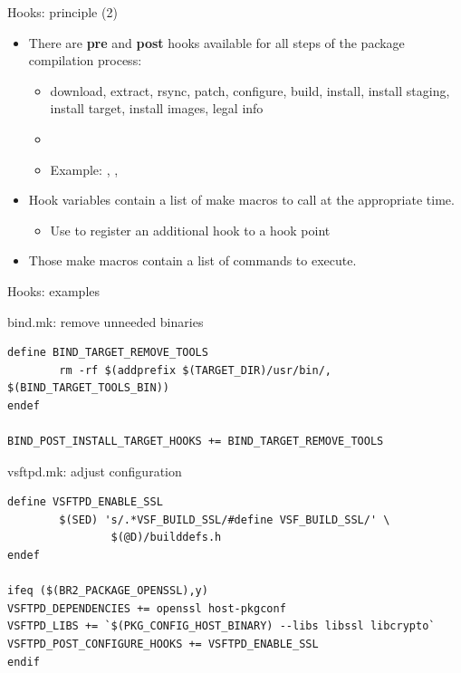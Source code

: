 \begin{frame}{Hooks: principle (2)}
  \begin{itemize}
  \item There are {\bf pre} and {\bf post} hooks available for all
    steps of the package compilation process:
    \begin{itemize}
    \item download, extract, rsync, patch, configure, build, install,
      install staging, install target, install images, legal info
    \item {}
    \item Example: ,
      , 
    \end{itemize}
  \item Hook variables contain a list of make macros to call at the
    appropriate time.
    \begin{itemize}
    \item Use \code{+=} to register an additional hook to a hook point
    \end{itemize}
  \item Those make macros contain a list of commands to execute.
  \end{itemize}
\end{frame}

\begin{frame}[fragile]{Hooks: examples}

\begin{block}{bind.mk: remove unneeded binaries}
  \begin{verbatim}
define BIND_TARGET_REMOVE_TOOLS
        rm -rf $(addprefix $(TARGET_DIR)/usr/bin/, $(BIND_TARGET_TOOLS_BIN))
endef

BIND_POST_INSTALL_TARGET_HOOKS += BIND_TARGET_REMOVE_TOOLS
  \end{verbatim}
\end{block}

\begin{block}{vsftpd.mk: adjust configuration}
  \begin{verbatim}
define VSFTPD_ENABLE_SSL
        $(SED) 's/.*VSF_BUILD_SSL/#define VSF_BUILD_SSL/' \
                $(@D)/builddefs.h
endef

ifeq ($(BR2_PACKAGE_OPENSSL),y)
VSFTPD_DEPENDENCIES += openssl host-pkgconf
VSFTPD_LIBS += `$(PKG_CONFIG_HOST_BINARY) --libs libssl libcrypto`
VSFTPD_POST_CONFIGURE_HOOKS += VSFTPD_ENABLE_SSL
endif
  \end{verbatim}
\end{block}

\end{frame}


